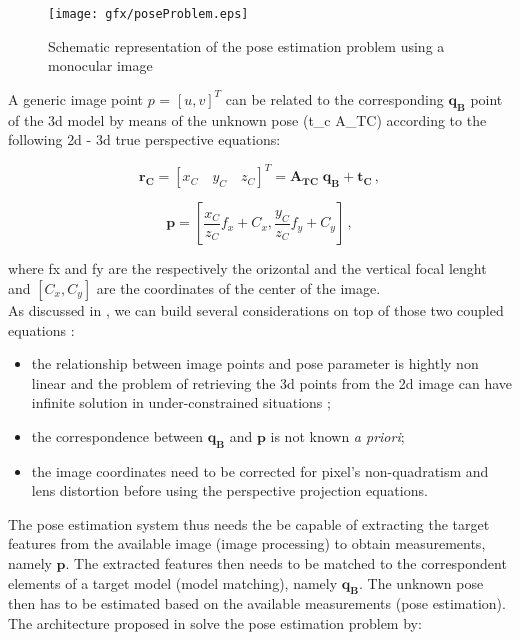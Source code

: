 \begin{figure}[htbp]
  \centering
  \texttt{[image: gfx/poseProblem.eps]}
  \caption{Schematic representation of the pose estimation problem using a monocular image \cite{Sharma2018}}
\end{figure}

A generic image point $p$ = $ [u,v]^T $ can be related to the corresponding $\mathbf{q_B}$ point of the \acrshort{3d} model by means of the unknown pose (\gls{t_c} \gls{A_TC}) according to the following \acrshort{2d} - \acrshort{3d} true perspective equations:

\begin{equation}
  \mathbf{r_C} = \left[x_C \quad  y_C \quad z_C\right]^T = \mathbf{A_{TC}} \; \mathbf{q_B} + \mathbf{t_C} \,,
\end{equation}

\begin{equation}
  \mathbf{p} = \left[ \frac{x_C}{z_C} f_x + C_x , \frac{y_C}{z_C} f_y + C_y \right] \,,
\end{equation}

where \gls{fx} and \gls{fy} are the respectively the orizontal and the vertical focal lenght and $[C_x, C_y]$ are the coordinates of the center of the image.\\
As discussed in \cite{D2014}, we can build several considerations on top of those two coupled equations :

\begin{itemize}
  \item the relationship between image points and pose parameter is hightly non linear and the problem of retrieving the \acrshort{3d} points from the \acrshort{2d} image can have infinite solution in under-constrained situations \cite{10.1145/358669.358692};
  \item the correspondence between $\mathbf{q_B}$ and $\mathbf{p}$ is not known \textit{a priori};
  \item the image coordinates need to be corrected for pixel's non-quadratism and lens distortion before using the perspective projection equations.
\end{itemize}

The pose estimation system thus needs the be capable of extracting the target features from the available image (image processing) to obtain measurements, namely  $\mathbf{p}$. The extracted features then needs to be matched to the correspondent elements of a target model (model matching), namely $\mathbf{q_B}$. The unknown pose then has to be estimated based on the available measurements (pose estimation).
The architecture proposed in \cite{Sharma2018} solve the pose estimation problem by:

